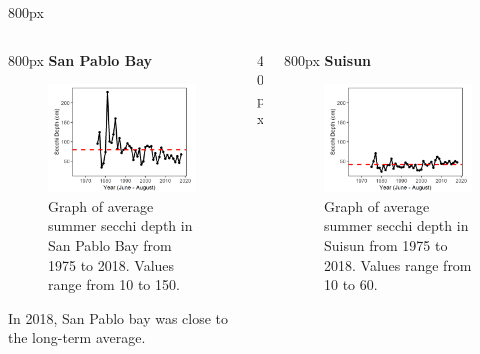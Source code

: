 \documentclass[
]{book}
\begin{document}
\begin{column}{800px\textwidth}
\end{column}

\begin{columns}[T]
\begin{column}{800px\textwidth}
\textbf{San Pablo Bay}

\begin{figure}
\includegraphics[width=15.25in]{figures/secchi_splsummer} \caption{Graph of average summer secchi depth in San Pablo Bay from 1975 to 2018. Values range from 10 to 150.}\label{fig:unnamed-chunk-51}
\end{figure}

In 2018, San Pablo bay was close to the long-term average.
\end{column}

\begin{column}{40px\textwidth}
~
\end{column}

\begin{column}{800px\textwidth}
\textbf{Suisun}

\begin{figure}
\includegraphics[width=15.25in]{figures/secchi_sssummer} \caption{Graph of average summer secchi depth in Suisun from 1975 to 2018. Values range from 10 to 60.}\label{fig:unnamed-chunk-52}
\end{figure}


\end{column}
\end{columns}
\end{document}
